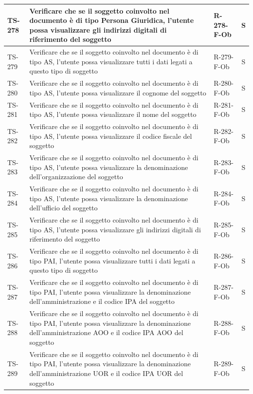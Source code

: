 \documentclass[a4paper,12pt]{article}
\begin{document}
\begin{longtable}{|p{1.5cm}|p{8.3cm}|p{2.4cm}|c|}
\hline
TS-278 & Verificare che se il soggetto coinvolto nel documento è di tipo Persona Giuridica, l'utente possa visualizzare gli indirizzi digitali di riferimento del soggetto & R-278-F-Ob & S \\
\hline
TS-279 & Verificare che se il soggetto coinvolto nel documento è di tipo AS, l'utente possa visualizzare tutti i dati legati a questo tipo di soggetto & R-279-F-Ob & S \\
\hline
TS-280 & Verificare che se il soggetto coinvolto nel documento è di tipo AS, l'utente possa visualizzare il cognome del soggetto & R-280-F-Ob & S \\
\hline
TS-281 & Verificare che se il soggetto coinvolto nel documento è di tipo AS, l'utente possa visualizzare il nome del soggetto & R-281-F-Ob & S \\
\hline
TS-282 & Verificare che se il soggetto coinvolto nel documento è di tipo AS, l'utente possa visualizzare il codice fiscale del soggetto & R-282-F-Ob & S \\
\hline
TS-283 & Verificare che se il soggetto coinvolto nel documento è di tipo AS, l'utente possa visualizzare la denominazione dell'organizzazione del soggetto & R-283-F-Ob & S \\
\hline
TS-284 & Verificare che se il soggetto coinvolto nel documento è di tipo AS, l'utente possa visualizzare la denominazione dell'ufficio del soggetto & R-284-F-Ob & S \\
\hline
TS-285 & Verificare che se il soggetto coinvolto nel documento è di tipo AS, l'utente possa visualizzare gli indirizzi digitali di riferimento del soggetto & R-285-F-Ob & S \\
\hline
TS-286 & Verificare che se il soggetto coinvolto nel documento è di tipo PAI, l'utente possa visualizzare tutti i dati legati a questo tipo di soggetto & R-286-F-Ob & S \\
\hline
TS-287 & Verificare che se il soggetto coinvolto nel documento è di tipo PAI, l'utente possa visualizzare la denominazione dell'amministrazione e il codice IPA del soggetto & R-287-F-Ob & S \\
\hline
TS-288 & Verificare che se il soggetto coinvolto nel documento è di tipo PAI, l'utente possa visualizzare la denominazione dell'amministrazione AOO e il codice IPA AOO del soggetto & R-288-F-Ob & S \\
\hline
TS-289 & Verificare che se il soggetto coinvolto nel documento è di tipo PAI, l'utente possa visualizzare la denominazione dell'amministrazione UOR e il codice IPA UOR del soggetto & R-289-F-Ob & S \\

\end{longtable}
\end{document}
